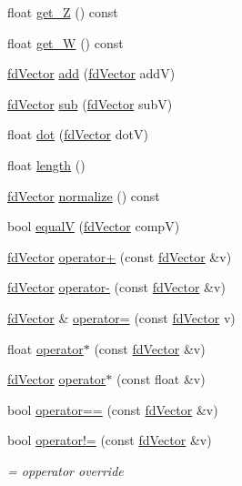 \begin{DoxyCompactItemize}
float \hyperlink{classfd_vector_afe07c9988db316dcc52e1115f82814dd}{get\+\_\+Z} () const
\item 
float \hyperlink{classfd_vector_a485db25930d37bead80a7e655b7b5767}{get\+\_\+W} () const
\item 
\hyperlink{classfd_vector}{fd\+Vector} \hyperlink{classfd_vector_a1b4b5c5a72a619525b6f2e737f56a32d}{add} (\hyperlink{classfd_vector}{fd\+Vector} addV)
\item 
\hyperlink{classfd_vector}{fd\+Vector} \hyperlink{classfd_vector_a93366497e312aa48a3e68cbab7996e7e}{sub} (\hyperlink{classfd_vector}{fd\+Vector} subV)
\item 
float \hyperlink{classfd_vector_abc99ed1ae023f50e3ef820ea22aa9eb1}{dot} (\hyperlink{classfd_vector}{fd\+Vector} dotV)
\item 
float \hyperlink{classfd_vector_aa87e134a74c0aedc1ce1b132b577702a}{length} ()
\item 
\hyperlink{classfd_vector}{fd\+Vector} \hyperlink{classfd_vector_af4c862ad62c5f1bd67d0fe808505e5c4}{normalize} () const
\item 
bool \hyperlink{classfd_vector_a860bf648b8f3c0ad6156cd28eb60c952}{equalV} (\hyperlink{classfd_vector}{fd\+Vector} compV)
\item 
\hyperlink{classfd_vector}{fd\+Vector} \hyperlink{classfd_vector_ad7efb00d2b8d61e54f1feb316bed83dc}{operator+} (const \hyperlink{classfd_vector}{fd\+Vector} \&v)
\item 
\hyperlink{classfd_vector}{fd\+Vector} \hyperlink{classfd_vector_a56bd82af8de4d77c772353ddafc3aa84}{operator-\/} (const \hyperlink{classfd_vector}{fd\+Vector} \&v)
\item 
\hyperlink{classfd_vector}{fd\+Vector} \& \hyperlink{classfd_vector_ad77d444cdd3c76f98b6c51e2bb2d4737}{operator=} (const \hyperlink{classfd_vector}{fd\+Vector} v)
\item 
float \hyperlink{classfd_vector_ac139bb822f7ffbfbcb0391d1fe88387e}{operator$\ast$} (const \hyperlink{classfd_vector}{fd\+Vector} \&v)
\item 
\hyperlink{classfd_vector}{fd\+Vector} \hyperlink{classfd_vector_aad262df21acfc3b8a6232ac657a9ccaf}{operator$\ast$} (const float \&v)
\item 
bool \hyperlink{classfd_vector_ad497efe7871fdca891854d2e45ff462f}{operator==} (const \hyperlink{classfd_vector}{fd\+Vector} \&v)
\item 
bool \hyperlink{classfd_vector_a8f600bd376c906ccb61143e82c8c92a6}{operator!=} (const \hyperlink{classfd_vector}{fd\+Vector} \&v)
\begin{DoxyCompactList}\small\item\em = opperator override \end{DoxyCompactList}\end{DoxyCompactItemize}
